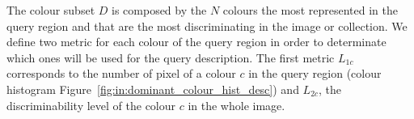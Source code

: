 








The colour subset $D$ is composed by the $N$ colours the most represented in the query region and that are the most discriminating in the image or collection.
We define two metric for each colour of the query region in order to determinate which ones will be used for the query description.
The first metric $L_{1c}$ corresponds to the number of pixel of a colour $c$ in the query region (colour histogram Figure~\ref{fig:in:dominant_colour_hist_desc}) and $L_{2c}$, the discriminability level of the colour $c$ in the whole image.

